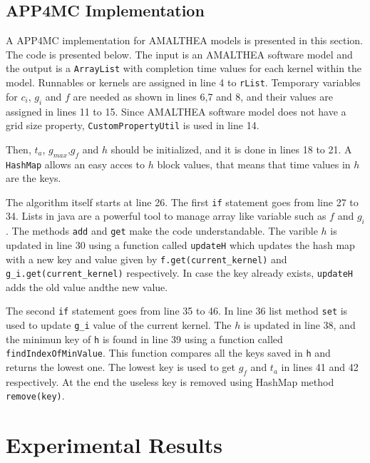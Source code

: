 \documentclass[
  12pt,
  a4paperpaper,
]{report}
\begin{document}
\hypertarget{app4mc-implementation}{%
\section{APP4MC Implementation}\label{app4mc-implementation}}
A APP4MC implementation for AMALTHEA models is presented in this section. 
The code is presented below. 
The input is an AMALTHEA software model and the output is a \texttt{ArrayList} with completion time values for each kernel within the model. 
Runnables or kernels are assigned in line 4 to \texttt{rList}.
Temporary variables for \(c_i\), \(g_i\) and \(f\) are needed as shown in lines 6,7 and 8, and their values are assigned in lines 11 to 15. 
Since AMALTHEA software model does not have a grid size property, \texttt{CustomPropertyUtil} is used in line 14. 


Then, \(t_a\), \(g_{max}\),\(g_f\) and \(h\) should be initialized, and it is done in lines 18 to 21. 
A \texttt{HashMap} allows an easy acces to \(h\) block values, that means that time values in \(h\) are the keys.  



The algorithm itself starts at line 26. 
The first \texttt{if} statement goes from line 27 to 34.
Lists in java are a powerful tool to manage array like variable such as \(f\) and \(g_i\). 
The methods \texttt{add} and \texttt{get} make the code understandable.
The varible \(h\) is updated in line 30 using a function called \texttt{updateH} which updates the hash map with a new key and value given by \texttt{f.get(current\_kernel)} and \texttt{g\_i.get(current\_kernel)} respectively. In case the key already exists, \texttt{updateH} adds the old value andthe new value. 

The second \texttt{if} statement goes from line 35 to 46. 
In line 36 list method \texttt{set} is used to update \texttt{g\_i} value of the current kernel.
The \(h\) is updated in line 38, and the minimun key of \texttt{h} is found in line 39 using a function called \texttt{findIndexOfMinValue}. This function compares all the keys saved in \texttt{h} and returns the lowest one.
The lowest key is used to get \(g_f\) and \(t_a\) in lines 41 and 42 respectively. 
At the end the useless key is removed using HashMap method \texttt{remove(key)}.

\hypertarget{experimental-results}{%
\chapter{Experimental Results}\label{experimental-results}}
\end{document}
